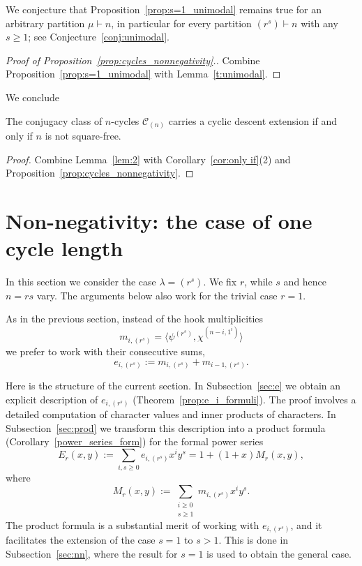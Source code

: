 \documentclass[ALCO,published]{cedram}
\newcommand{\C}{\mathcal C}
\begin{document}
\begin{remark}
	We conjecture that Proposition~\ref{prop:s=1_unimodal} remains true for an arbitrary partition $\mu \vdash n$, in particular for every partition $(r^s) \vdash n$ with any	$s\ge 1$; see Conjecture~\ref{conj:unimodal}.
\end{remark}

\begin{proof}[Proof of Proposition~\ref{prop:cycles_nonnegativity}.]
    Combine Proposition~\ref{prop:s=1_unimodal} with   Lemma~\ref{t:unimodal}.
\end{proof}

We conclude 

\begin{corollary}\label{prop:CDE_cycles}
    The conjugacy class of $n$-cycles $\C_{(n)}$ carries a cyclic descent extension if and only if $n$ is not square-free.
\end{corollary}
	 
\begin{proof} 
    Combine Lemma~\ref{lem:2} with Corollary~\ref{cor:only if}(2) and Proposition~\ref{prop:cycles_nonnegativity}. 
\end{proof}


\section{Non-negativity: the case of one cycle length}
\label{sec:Witt}

In this section we consider the case $\lambda = (r^s)$. 
We fix $r$, while $s$ and hence $n=rs$ vary. 
The arguments below also work for the trivial case $r=1$.
		
As in the previous section, instead of the hook multiplicities 
\[
    m_{i,(r^s)} 
    = \langle \psi^{(r^s)}, \chi^{(n-i,1^i)} \rangle
\]
we prefer to work with their consecutive sums,
\[
    e_{i,(r^s)} := m_{i,(r^s)} + m_{i-1,(r^s)}.
\]
		
Here is the structure of the current section.
In Subsection~\ref{sec:e} 
we obtain an explicit description of $e_{i,(r^s)}$ (Theorem~\ref{prop:e_i_formuli}). The proof involves a detailed computation of character values and inner products of characters.
In Subsection~\ref{sec:prod} we 
transform this description into
a product formula (Corollary~\ref{power_series_form})
for the formal power series 
\[
E_r(x,y) 
:= \sum_{i,s \ge 0} e_{i,(r^s)} x^i y^s 
= 1 + (1 + x) M_r(x,y),  
\]
where 
\[
M_r(x,y) 
:= \sum_{\substack{i \ge 0 \\ s \ge 1}} m_{i,(r^s)} x^i y^s.
\]
The product formula is a substantial merit of working with $e_{i,(r^s)}$, and it facilitates the extension of the case $s=1$ to $s>1$. 
This is done in Subsection~\ref{sec:nn}, where the result for $s=1$ is used to obtain the general case.
		
\end{document}
